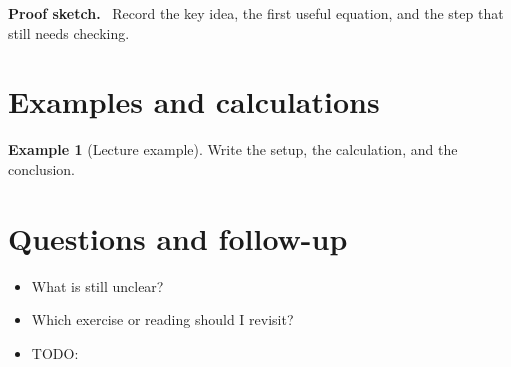 \documentclass[11pt]{article}
\newcommand{\1}{\mathbf{1}}
\theoremstyle{notestyle}
\theoremstyle{definition}
\newtheorem{example}[theorem]{Example}
\newenvironment{proofsketch}{\par\noindent\textbf{Proof sketch.}\ }{\par}
\begin{document}
\begin{proofsketch}
Record the key idea, the first useful equation, and the step that still needs checking.
\end{proofsketch}

\section{Examples and calculations}
\begin{example}[Lecture example]
Write the setup, the calculation, and the conclusion.
\end{example}

\section{Questions and follow-up}
\begin{itemize}
  \item What is still unclear?
  \item Which exercise or reading should I revisit?
  \item TODO:
\end{itemize}
\end{document}
